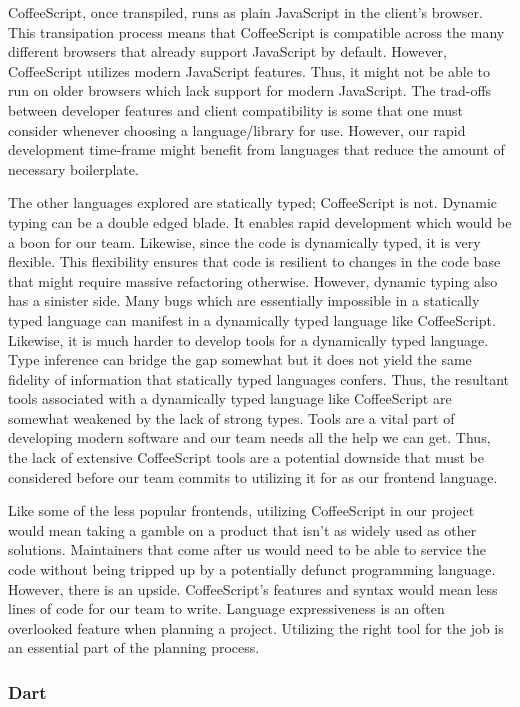 \documentclass[12pt]{report}
\begin{document}
CoffeeScript, once transpiled, runs as plain JavaScript in the client's browser.\cite{coffeescriptguide} This transipation process means that CoffeeScript is compatible across the many different browsers that already support JavaScript by default. However, CoffeeScript utilizes modern JavaScript features.\cite{coffeescriptguide} Thus, it might not be able to run on older browsers which lack support for modern JavaScript. The trad-offs between developer features and client compatibility is some that one must consider whenever choosing a language/library for use. However, our rapid development time-frame might benefit from languages that reduce the amount of necessary boilerplate.

The other languages explored are statically typed; CoffeeScript is not. Dynamic typing can be a double edged blade. It enables rapid development which would be a boon for our team. Likewise, since the code is dynamically typed, it is very flexible. This flexibility ensures that code is resilient to changes in the code base that might require massive refactoring otherwise. However, dynamic typing also has a sinister side. Many bugs which are essentially impossible in a statically typed language can manifest in a dynamically typed language like CoffeeScript. Likewise, it is much harder to develop tools for a dynamically typed language. Type inference can bridge the gap somewhat but it does not yield the same fidelity of information that statically typed languages confers. Thus, the resultant tools associated with a dynamically typed language like CoffeeScript are somewhat weakened by the lack of strong types. Tools are a vital part of developing modern software and our team needs all the help we can get. Thus, the lack of extensive CoffeeScript tools are a potential downside that must be considered before our team commits to utilizing it for as our frontend language.

Like some of the less popular frontends, utilizing CoffeeScript in our project would mean taking a gamble on a product that isn't as widely used as other solutions. Maintainers that come after us would need to be able to service the code without being tripped up by a potentially defunct programming language. However, there is an upside. CoffeeScript's features and syntax would mean less lines of code for our team to write. Language expressiveness is an often overlooked feature when planning a project. Utilizing the right tool for the job is an essential part of the planning process.

\subsubsection*{Dart}
\end{document}
